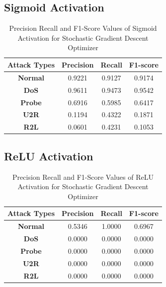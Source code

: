 \documentclass[12pt, a4paper]{report}
\begin{document}
\begin{appendices}
	 \subsection{Sigmoid Activation}
   	\begin{table}[h]
	\centering
	\captionsetup{justification=centering,margin=2cm}
	\begin{tabular}{|c|c|c|c|}
	\hline
	\textbf{Attack Types} & \textbf{Precision} & \textbf{Recall} & \textbf{F1-score} \\ \hline
	\textbf{Normal}       & 0.9221             & 0.9127          & 0.9174            \\ \hline
	\textbf{DoS}          & 0.9611             & 0.9473          & 0.9542            \\ \hline
	\textbf{Probe}        & 0.6916             & 0.5985          & 0.6417            \\ \hline
	\textbf{U2R}          & 0.1194             & 0.4322          & 0.1871            \\ \hline
	\textbf{R2L}          & 0.0601             & 0.4231          & 0.1053            \\ \hline
	\end{tabular}
	\caption{Precision Recall and F1-Score Values of Sigmoid Activation for Stochastic Gradient Descent Optimizer}
	\label{classification sigmoid sgd tflearn}
	\end{table} 

	\subsection{ReLU Activation}
	 \begin{table}[h]
		\centering
		\captionsetup{justification=centering,margin=2cm}
		\begin{tabular}{|c|c|c|c|}
		\hline
		\textbf{Attack Types} & \textbf{Precision} & \textbf{Recall} & \textbf{F1-score} \\ \hline
		\textbf{Normal}       & 0.5346             & 1.0000          & 0.6967            \\ \hline
		\textbf{DoS}          & 0.0000             & 0.0000          & 0.0000            \\ \hline
		\textbf{Probe}        & 0.0000             & 0.0000          & 0.0000            \\ \hline
		\textbf{U2R}          & 0.0000             & 0.0000          & 0.0000            \\ \hline
		\textbf{R2L}          & 0.0000             & 0.0000          & 0.0000            \\ \hline
		\end{tabular}
		\caption{Precision Recall and F1-Score Values of ReLU Activation for Stochastic Gradient Descent Optimizer}
		\label{classification relu sgd tflearn}
		\end{table} 
	

\end{appendices}
\end{document}
